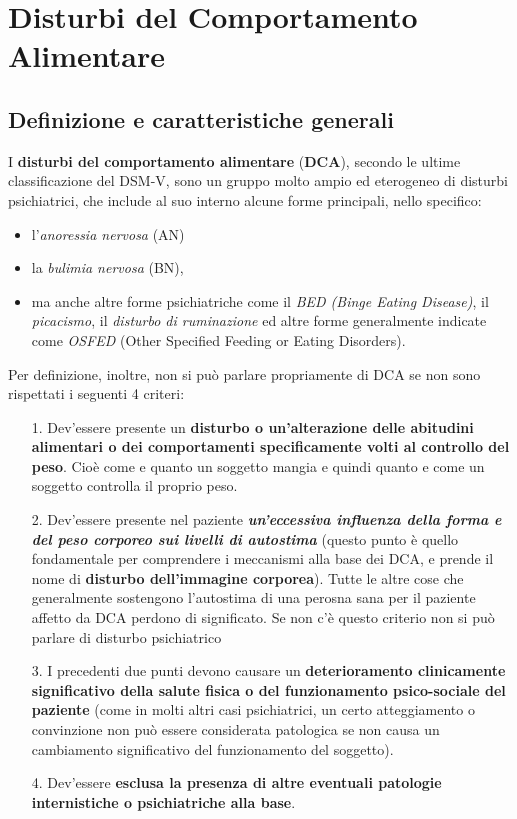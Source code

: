 \section{Disturbi del Comportamento Alimentare}

\subsection{Definizione e caratteristiche generali}

I \textbf{disturbi del comportamento alimentare} (\textbf{DCA}), secondo
le ultime classificazione del DSM-V, sono un gruppo molto ampio ed
eterogeneo di disturbi psichiatrici, che include al suo interno alcune
forme principali, nello specifico:

\begin{itemize}
\item
  l'\emph{anoressia nervosa} (AN)
\item
  la \emph{bulimia nervosa} (BN),
\item
  ma anche altre forme psichiatriche come il \emph{BED (Binge Eating
  Disease)}, il \emph{picacismo}, il \emph{disturbo di ruminazione} ed
  altre forme generalmente indicate come \emph{OSFED} (Other Specified
  Feeding or Eating Disorders).
\end{itemize}

Per definizione, inoltre, non si può parlare propriamente di DCA se non
sono rispettati i seguenti 4 criteri:

\begin{itemize}
\item[1.]
  Dev'essere presente un \textbf{disturbo o un'alterazione delle
  abitudini alimentari o dei comportamenti specificamente volti al
  controllo del peso}. Cioè come e quanto un soggetto mangia e quindi
  quanto e come un soggetto controlla il proprio peso.
\item[2.]
  Dev'essere presente nel paziente \textbf{\emph{un'eccessiva influenza
  della forma e del peso corporeo sui livelli di autostima}} (questo
  punto è quello fondamentale per comprendere i meccanismi alla base dei
  DCA, e prende il nome di \textbf{disturbo dell'immagine corporea}).
  Tutte le altre cose che generalmente sostengono l'autostima di una
  perosna sana per il paziente affetto da DCA perdono di significato. Se
  non c'è questo criterio non si può parlare di disturbo psichiatrico
\item[3.]
  I precedenti due punti devono causare un \textbf{deterioramento
  clinicamente significativo della salute fisica o del funzionamento
  psico-sociale del paziente} (come in molti altri casi psichiatrici, un
  certo atteggiamento o convinzione non può essere considerata
  patologica se non causa un cambiamento significativo del funzionamento
  del soggetto).
\item[4.]
  Dev'essere \textbf{esclusa la presenza di altre eventuali patologie
  internistiche o psichiatriche alla base}.
\end{itemize}

